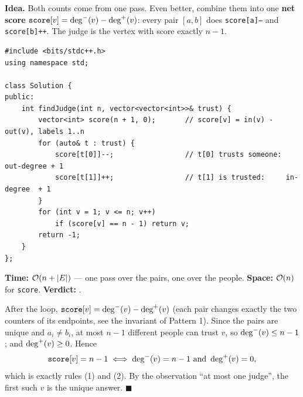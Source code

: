 \begin{algorithmbox}
\textbf{Idea.} Both counts come from one pass. Even better, combine them into one \textbf{net score} $\texttt{score}[v] = \deg^{-}(v) - \deg^{+}(v)$: every pair $[a,b]$ does \texttt{score[a]--} and \texttt{score[b]++}. The judge is the vertex with score exactly $n-1$.
\begin{lstlisting}[style=cpp]
#include <bits/stdc++.h>
using namespace std;

class Solution {
public:
    int findJudge(int n, vector<vector<int>>& trust) {
        vector<int> score(n + 1, 0);       // score[v] = in(v) - out(v), labels 1..n
        for (auto& t : trust) {
            score[t[0]]--;                 // t[0] trusts someone: out-degree + 1
            score[t[1]]++;                 // t[1] is trusted:     in-degree  + 1
        }
        for (int v = 1; v <= n; v++)
            if (score[v] == n - 1) return v;
        return -1;
    }
};
\end{lstlisting}
\begin{complexitybox}
\textbf{Time:} $\mathcal{O}(n + |E|)$ --- one pass over the pairs, one over the people. \textbf{Space:} $\mathcal{O}(n)$ for \texttt{score}. \textbf{Verdict:} \ac{}.
\end{complexitybox}
\end{algorithmbox}

\begin{invariantbox}[Why score $= n-1$ identifies the judge]
After the loop, $\texttt{score}[v] = \deg^{-}(v) - \deg^{+}(v)$ (each pair changes exactly the two counters of its endpoints, see the invariant of Pattern 1). Since the pairs are unique and $a_i \ne b_i$, at most $n-1$ different people can trust $v$, so $\deg^{-}(v) \le n-1$; and $\deg^{+}(v) \ge 0$. Hence
\[
\texttt{score}[v] = n-1 \iff \deg^{-}(v) = n-1 \text{ and } \deg^{+}(v) = 0,
\]
which is exactly rules (1) and (2). By the observation ``at most one judge'', the first such $v$ is the unique answer. \hfill$\blacksquare$
\end{invariantbox}


